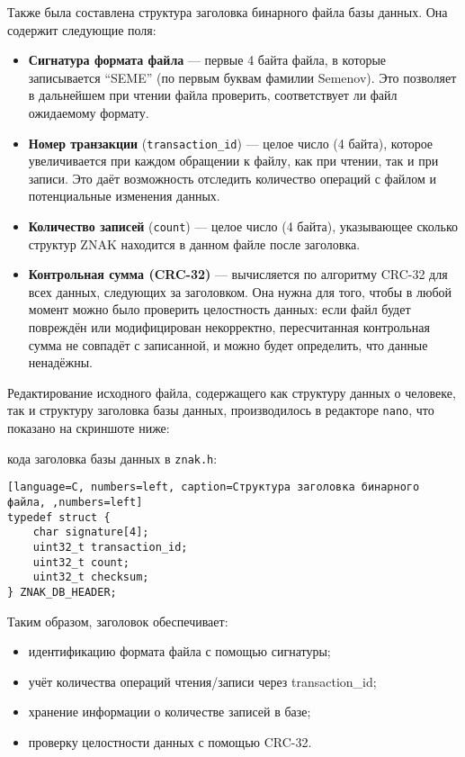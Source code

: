 Также была составлена структура заголовка бинарного файла базы данных. Она содержит следующие поля:
\begin{itemize}
  \item \textbf{Сигнатура формата файла} --- первые 4 байта файла, в которые записывается ``SEME'' (по первым буквам фамилии Semenov). Это позволяет в дальнейшем при чтении файла проверить, соответствует ли файл ожидаемому формату.
  
  \item \textbf{Номер транзакции} (\texttt{transaction\_id}) --- целое число (4 байта), которое увеличивается при каждом обращении к файлу, как при чтении, так и при записи. Это даёт возможность отследить количество операций с файлом и потенциальные изменения данных.
  
  \item \textbf{Количество записей} (\texttt{count}) --- целое число (4 байта), указывающее сколько структур ZNAK находится в данном файле после заголовка.
  
  \item \textbf{Контрольная сумма (CRC-32)} --- вычисляется по алгоритму CRC-32 для всех данных, следующих за заголовком. Она нужна для того, чтобы в любой момент можно было проверить целостность данных: если файл будет повреждён или модифицирован некорректно, пересчитанная контрольная сумма не совпадёт с записанной, и можно будет определить, что данные ненадёжны.
\end{itemize}

Редактирование исходного файла, содержащего как структуру данных о человеке, так и структуру заголовка базы данных, производилось в редакторе \texttt{nano}, что показано на скриншоте ниже:


 кода заголовка базы данных в \texttt{znak.h}:
\begin{lstlisting}[language=C, numbers=left, caption=Структура заголовка бинарного файла, ,numbers=left]
typedef struct {
    char signature[4];
    uint32_t transaction_id;
    uint32_t count;
    uint32_t checksum;
} ZNAK_DB_HEADER;
\end{lstlisting}

Таким образом, заголовок обеспечивает:
\begin{itemize}
  \item идентификацию формата файла с помощью сигнатуры;
  \item учёт количества операций чтения/записи через transaction\_id;
  \item хранение информации о количестве записей в базе;
  \item проверку целостности данных с помощью CRC-32.
\end{itemize}

